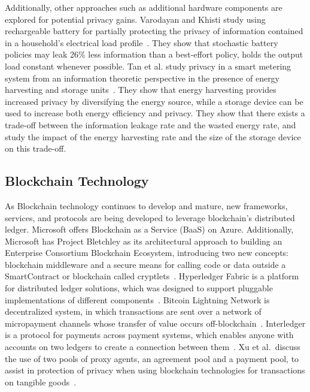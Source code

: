 Additionally, other approaches such as additional hardware components are explored for potential privacy gains. Varodayan and Khisti study using rechargeable battery for partially protecting the privacy of information contained in a household's electrical load profile~\cite{varodayan2011smart}. They show that stochastic battery policies may leak 26\% less information than a best-effort policy, holds the output load constant whenever possible. Tan et al. study privacy in a smart metering system from an information theoretic perspective in the presence of energy harvesting and storage units~\cite{tan2013increasing}. They show that energy harvesting provides increased privacy by diversifying the energy source, while a storage device can be used to increase both energy efficiency and privacy. They show that there exists a trade-off between the information leakage rate and the wasted energy rate, and study the impact of the energy harvesting rate and the size of the storage device on this trade-off.



\subsection{Blockchain Technology}

As Blockchain technology continues to develop and mature, new frameworks, services, and protocols are being developed to leverage blockchain's distributed ledger. Microsoft offers Blockchain as a Service (BaaS) on Azure. Additionally, Microsoft has Project Bletchley as its architectural approach to building an Enterprise Consortium Blockchain Ecosystem, introducing two new concepts: blockchain middleware and a secure means for calling code or data outside a SmartContract or blockchain called cryptlets~\cite{gray2016introducing}. Hyperledger Fabric is a platform for distributed ledger solutions, which was designed to support pluggable implementations of different components~\cite{hyperledger2017fabric}. Bitcoin Lightning Network is decentralized system, in which transactions are sent over a network of micropayment channels whose transfer of value occurs off-blockchain~\cite{poon2016bitcoin}. Interledger is a protocol for payments across payment systems, which enables anyone with accounts on two ledgers to create
a connection between them~\cite{thomas_protocol}. Xu et al.\ discuss the use of two pools of proxy agents, an agreement pool and a payment pool, to assist in protection of privacy when using blockchain technologies for transactions on tangible goods~\cite{Xu2017}.



